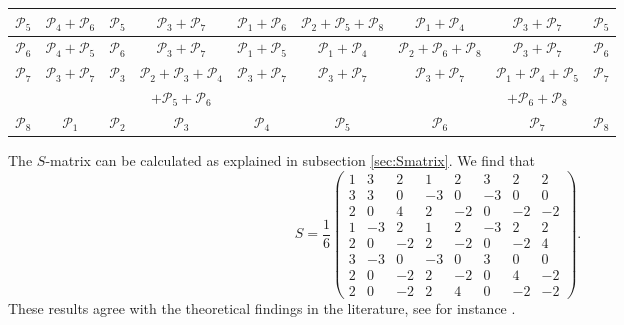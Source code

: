\documentclass[12 pt]{article}
\begin{document}
\begin{center}
\begin{tabular}{ c || c | c | c | c | c | c | c | c |}
        $\mathcal{P}_5$ & $\mathcal{P}_4+\mathcal{P}_6$               & $\mathcal{P}_5$ & $\mathcal{P}_3+\mathcal{P}_7$               & $\mathcal{P}_1+\mathcal{P}_6$               & $\mathcal{P}_2+\mathcal{P}_5+\mathcal{P}_8$ & $\mathcal{P}_1+\mathcal{P}_4$               & $\mathcal{P}_3+\mathcal{P}_7$               & $\mathcal{P}_5$ \\  \hline
        $\mathcal{P}_6$ & $\mathcal{P}_4+\mathcal{P}_5$               & $\mathcal{P}_6$ & $\mathcal{P}_3+\mathcal{P}_7$               & $\mathcal{P}_1+\mathcal{P}_5$               & $\mathcal{P}_1+\mathcal{P}_4$               & $\mathcal{P}_2+\mathcal{P}_6+\mathcal{P}_8$ & $\mathcal{P}_3+\mathcal{P}_7$               & $\mathcal{P}_6$ \\  \hline
        $\mathcal{P}_7$ & $\mathcal{P}_3+\mathcal{P}_7$               & $\mathcal{P}_3$ & $\mathcal{P}_2+\mathcal{P}_3+\mathcal{P}_4$ & $\mathcal{P}_3+\mathcal{P}_7$               & $\mathcal{P}_3+\mathcal{P}_7$               & $\mathcal{P}_3+\mathcal{P}_7$               & $\mathcal{P}_1+\mathcal{P}_4+\mathcal{P}_5$ & $\mathcal{P}_7$ \\
                        &                                             &                 & $+\mathcal{P}_5+\mathcal{P}_6$              &                                             &                                             &                                             & $+\mathcal{P}_6+\mathcal{P}_8$              &                 \\ \hline
        $\mathcal{P}_8$ & $\mathcal{P}_1$                             & $\mathcal{P}_2$ & $\mathcal{P}_3$                             & $\mathcal{P}_4$                             & $\mathcal{P}_5$                             & $\mathcal{P}_6$                             & $\mathcal{P}_7$                             & $\mathcal{P}_8$ \\

        \hline
    \end{tabular}
\end{center}
\normalsize
The $S$-matrix can be calculated as explained in subsection \ref{sec:Smatrix}. We find that
$$
    S=\frac{1}{6}
    \begin{pmatrix}

        1 &3  &2  &1  &2  &3  &2  &2\\
        3 &3  &0  &-3 &0  &-3 &0  &0\\
        2 &0  &4  &2  &-2 &0  &-2 &-2\\
        1 &-3 &2  &1  &2  &-3 &2  &2\\
        2 &0  &-2 &2  &-2 &0  &-2 &4\\
        3 &-3 &0  &-3 &0  &3  &0  &0\\
        2 &0  &-2 &2  &-2 &0  &4  &-2\\
        2 &0  &-2 &2  &4  &0  &-2 &-2
    \end{pmatrix}.
$$
These results agree with the theoretical findings in the literature, see for instance \cite{DS3}.
\end{document}
